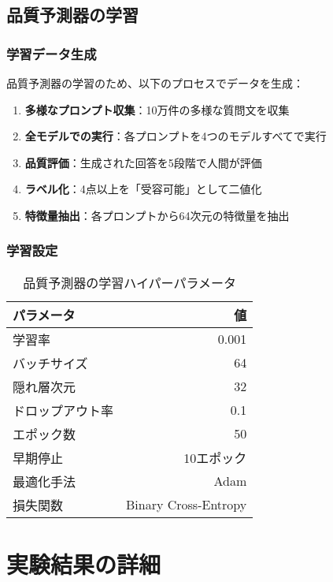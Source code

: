 \documentclass[a4paper,12pt]{jsarticle}
\begin{document}
\subsection{品質予測器の学習}

\subsubsection{学習データ生成}

品質予測器の学習のため、以下のプロセスでデータを生成：

\begin{enumerate}
\item \textbf{多様なプロンプト収集}：10万件の多様な質問文を収集
\item \textbf{全モデルでの実行}：各プロンプトを4つのモデルすべてで実行
\item \textbf{品質評価}：生成された回答を5段階で人間が評価
\item \textbf{ラベル化}：4点以上を「受容可能」として二値化
\item \textbf{特徴量抽出}：各プロンプトから64次元の特徴量を抽出
\end{enumerate}

\subsubsection{学習設定}

\begin{table}[H]
\centering
\caption{品質予測器の学習ハイパーパラメータ}
\begin{tabular}{|l|r|}
\hline
\textbf{パラメータ} & \textbf{値} \\
\hline
学習率 & 0.001 \\
バッチサイズ & 64 \\
隠れ層次元 & 32 \\
ドロップアウト率 & 0.1 \\
エポック数 & 50 \\
早期停止 & 10エポック \\
最適化手法 & Adam \\
損失関数 & Binary Cross-Entropy \\
\hline
\end{tabular}
\end{table}

\section{実験結果の詳細}
\end{document}
